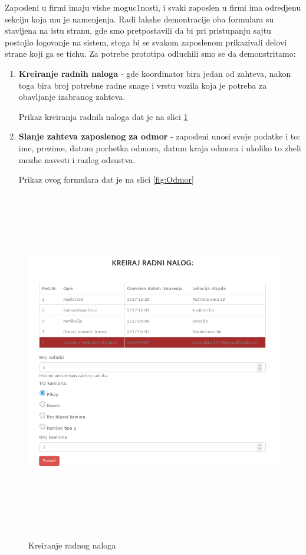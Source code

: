 \documentclass[10 pt]{article}
\begin{document}
	Zaposleni u firmi imaju vishe moguc1nosti, i svaki zaposlen u firmi ima odredjenu sekciju koja mu je namenjenja. Radi lakshe demontracije oba formulara su stavljena na istu stranu, gde smo pretpostavili da bi pri pristupanju sajtu postojlo logovanje na sistem, stoga bi se svakom zaposlenom prikazivali delovi strane koji ga se tichu. Za potrebe prototipa odluchili smo se da demonstritamo:
		\begin{enumerate}
			\item \textbf{Kreiranje radnih naloga} - gde koordinator bira jedan od zahteva, nakon toga bira broj potrebne radne snage i vrstu vozila koja je potreba za obavljanje izabranog zahteva.
			
			Prikaz kreiranja radnih naloga dat je na slici \ref{fig:radniNalog}
			
			\item \textbf{Slanje zahteva zaposlenog za odmor} - zaposleni unosi svoje podatke i to: ime, prezime, datum pochetka odmora, datum kraja odmora i ukoliko to zheli mozhe navesti i razlog odsustva.
			
			Prikaz ovog formulara dat je na slici \ref{fig:Odmor}
		\end{enumerate}
	
	
		\begin{figure}[H]
			\centering
			\includegraphics[width=15cm,height=15cm,keepaspectratio]{GUI/formularRadniNalog.png}\\
			\caption{Kreiranje radnog naloga}
			\label{fig:radniNalog}
		\end{figure}
		
\end{document}
